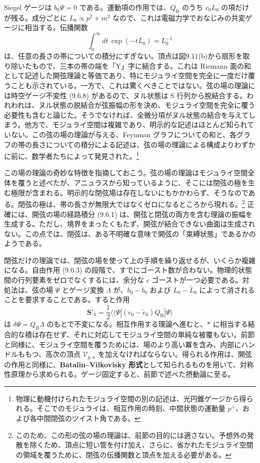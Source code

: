Siegel ゲージは $b_0\Psi=0$ である。運動項の作用では、$Q_{\mathrm B}$ のうち $c_0L_0$ の項だけが残る。成分ごとに $L_0\propto p^2+m^2$ なので、これは電磁力学でおなじみの共変ゲージに相当する。伝播関数
\begin{equation}
\int_0^\infty dt\,\exp(-tL_0)=L_0^{-1}
\tag{9.6.13}\label{eq:9.6.13}
\end{equation}
は、任意の長さの帯についての積分にすぎない。頂点は図9.11(b)から扇形を取り除いたもので、三本の帯の端を「Y」字に結合する。これは Riemann 面の和として記述した開弦理論と等価であり、特にモジュライ空間を完全に一度だけ覆うことも示されている。一方で、これは驚くべきことではない。弦の場の理論には時空ゲージ不変性 (9.6.8) があるので、ヌル状態は S 行列から脱結合する。われわれは、ヌル状態の脱結合が弦振幅の形を決め、モジュライ空間を完全に覆う必要性も含むと論じた。そうでなければ、全微分項がヌル状態の結合を与えてしまう。他方で、モジュライ空間は複雑であり、明示的な記述はほとんど知られていない。この弦の場の理論が与える、Feynman グラフについての和と、各グラフの帯の長さについての積分による記述は、弦の場の理論による構成よりわずかに前に、数学者たちによって発見された。\footnote[2]{物理に動機付けられたモジュライ空間の別の記述は、光円錐ゲージから得られる。そこでのモジュライは、相互作用の時刻、中間状態の運動量 $p^+$、および各中間閉弦のツイスト角である。}

この場の理論の奇妙な特徴を指摘しておこう。弦の場の理論はモジュライ空間全体を覆うと述べたが、アニュラスから知っているように、そこには閉弦の極を生む極限が含まれる。明示的な閉弦場は存在しないにもかかわらず、そうなのである。閉弦の極は、帯の長さが無限大ではなくゼロになるところから現れる。\footnote[3]{このため、この形の弦の場の理論は、前節の目的には適さない。予想外の発散を除くため、頂点に短い管を付け加え、さらに、省かれたモジュライ空間の領域を覆うために、閉弦の伝播関数と頂点を加える必要がある。}
正確には、開弦の場の経路積分 (9.6.1) は、開弦と閉弦の両方を含む理論の振幅を生成する。ただし、境界をまったくもたず、開弦が結合できない曲面は生成されない。この点では、閉弦は、ある不明確な意味で開弦の「束縛状態」であるかのようである。

閉弦だけの理論では、閉弦の場を使って上の手順を繰り返せるが、いくらか複雑になる。自由作用 (9.6.3) の段階で、すでにゴースト数が合わない。物理的状態間の行列要素をゼロでなくするには、余分な $c$ ゴーストが一つ必要である。対処法は、弦の場 $\Psi$ とゲージ変換 $\Lambda$ が、$b_0-\widetilde b_0$ および $L_0-\widetilde L_0$ によって消されることを要求することである。すると作用
\begin{equation}
\boldsymbol S'_0=\frac12
\langle\!\langle\Psi|(c_0-\widetilde c_0)Q_{\mathrm B}|\Psi\rangle
\tag{9.6.14}\label{eq:9.6.14}
\end{equation}
は $\delta\Psi=Q_{\mathrm B}\Lambda$ のもとで不変になる。相互作用する理論へ進むと、$*$ に相当する結合的な積は存在せず、それに対応してモジュライ空間の単純な被覆もない。前節と同様に、モジュライ空間を覆うためには、場のより高い冪を含み、内部にハンドルももつ、高次の頂点 $\mathcal V_{g,n}$ を加えなければならない。得られる作用は、開弦の作用と同様に、\textbf{Batalin--Vilkovisky 形式}として知られるものを用いて、対称性原理から求められる。ゲージ固定すると、前節で述べた摂動論に至る。

